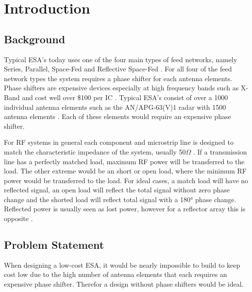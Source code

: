 %
%
%
\chapter{Introduction}

\section{Background}
Typical ESA’s today uses one of the four main types of feed networks, namely Series, Parallel, Space-Fed and Reflective Space-Fed \cite{ESAfeed}. For all four of the feed network types the system requires a phase shifter for each antenna elements. Phase shifters are expensive devices especially at high frequency bands such as X-Band and cost well over \$100 per IC \cite{HMC647}. Typical ESA’s consist of over a 1000 individual antenna elements such as the AN/APG-63(V)1 radar with 1500 antenna elements \cite{reflectarrayy}. Each of these elements would require an expensive phase shifter. 

For RF systems in general each component and microstrip line is designed to match the characteristic impedance of the system, usually 50$\Omega$ . If a transmission line has a perfectly matched load, maximum RF power will be transferred to the load. The other extreme would be an short or open load, where the minimum RF power would be transferred to the load. For ideal cases, a match load will have no reflected signal, an open load will reflect the total signal without zero phase change and the shorted load will reflect total signal with a 180° phase change. Reflected power is usually seen as lost power, however for a reflector array this is opposite \cite{VSWR}.

\section{Problem Statement}
When designing a low-cost ESA, it would be nearly impossible to build to keep cost low due to the high number of antenna elements that each requires an expensive phase shifter. Therefor a design without phase shifters would be ideal.

